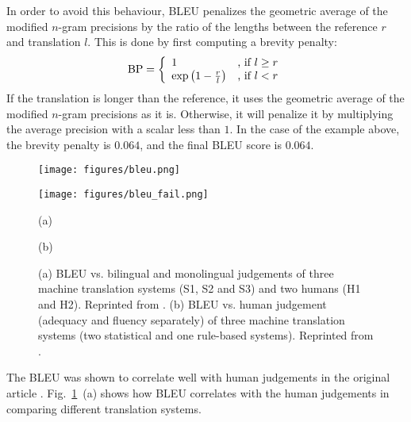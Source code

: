 \documentclass{report}
\newcommand{\BP}{\text{BP}}
\begin{document}
In order to avoid this behaviour, BLEU penalizes the geometric average of the
modified $n$-gram precisions by the ratio of the lengths between the reference
$r$ and translation $l$. This is done by first computing a brevity penalty:
\begin{align*}
    \BP = \left\{ 
        \begin{array}{l l}
            1 & \text{, if }l \geq r \\
            \exp\left( 1 - \frac{r}{l} \right) & \text{, if }l < r
        \end{array}
        \right.
\end{align*}
If the translation is longer than the reference, it uses the geometric average
of the modified $n$-gram precisions as it is. Otherwise, it will penalize it by
multiplying the average precision with a scalar less than $1$. 
In the case of the example above, the brevity penalty is $0.064$, and the final
BLEU score is $0.064$. 

\begin{figure}[ht]
    \centering
    \begin{minipage}{0.48\textwidth}
        \centering
        \texttt{[image: figures/bleu.png]}
    \end{minipage}
    \hfill
    \begin{minipage}{0.48\textwidth}
        \centering
        \texttt{[image: figures/bleu\_fail.png]}
    \end{minipage}

    \begin{minipage}{0.48\textwidth}
        \centering
        (a)
    \end{minipage}
    \hfill
    \begin{minipage}{0.48\textwidth}
        \centering
        (b)
    \end{minipage}
    \caption{(a) BLEU vs. bilingual and monolingual judgements of three machine
    translation systems (S1, S2 and S3) and two humans (H1 and H2). Reprinted
from \cite{papineni2002bleu}. (b) BLEU vs. human judgement (adequacy and fluency
separately) of three machine translation systems (two statistical and one
rule-based systems). Reprinted from \cite{callison2006re}.}
    \label{fig:bleu}
\end{figure}

The BLEU was shown to correlate well with human judgements in the original
article \cite{papineni2002bleu}. Fig.~\ref{fig:bleu}~(a) shows how BLEU correlates
with the human judgements in comparing different translation systems.
\end{document}
